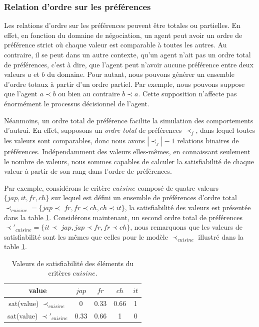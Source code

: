 \subsubsection{Relation d'ordre sur les préférences}

Les relations d'ordre sur les préférences peuvent être totales ou partielles. En effet, en fonction du domaine de négociation, un agent peut avoir un ordre de préférence strict où chaque valeur est comparable à toutes les autres. Au contraire, il se peut dans un autre contexte, qu'un agent n'ait pas un ordre total de préférences, c'est à dire, que l'agent peut n'avoir aucune préférence entre deux valeurs $a$ et $b$ du domaine. Pour autant, nous pouvons générer un ensemble d'ordre totaux à partir d'un ordre partiel. Par exemple, nous pouvons suppose que l'agent $a \prec b$ ou bien au contraire $b \prec a$. Cette supposition n'affecte pas énormément le processus décisionnel de l'agent. 

Néanmoins, un ordre total de préférence facilite la simulation des comportements d'autrui. En effet, supposons un \textit{ordre total} de préférences $\prec_j$, dans lequel toutes les valeurs sont comparables, donc nous avons $|\prec_j| -1$ relations binaires de préférences. Indépendamment des valeurs elles-mêmes, en connaissant seulement le nombre de valeurs, nous sommes capables de calculer la satisfiabilité de chaque valeur à partir de son rang dans l'ordre de préférences.

Par exemple, considérons le critère $cuisine$ composé de quatre valeurs $\{jap,it,fr,ch\}$ sur lequel est défini un ensemble de préférences d'ordre total $\prec_{cuisine} = \{jap$$\prec$ $fr, fr$$\prec$$ ch, ch$$\prec$$it\}$, la satisfiabilité des valeurs est présentée dans la table \ref{tab:ex2_sat}. Considérons maintenant, un second ordre total de préférences $\prec'_{cuisine} = \{it$$\prec$ $jap, jap$$\prec$$ fr, fr$$\prec$$ch\}$, nous remarquons que les valeurs de satisfiabilité sont les mêmes que celles pour le modèle $\prec_{cuisine}$ illustré dans la table \ref{tab:ex2_sat}. 


	\begin{table} [h]
		\centering
		\caption{Valeurs de satisfiabilité des éléments du critères $cuisine$.}
		\begin{tabular}{ |c|c|c|c|c| }
			\hline
			value & $jap$ & $fr$ & $ch$ & $it$ \\	
			\hline
			sat(value) $\prec_{cuisine}$ & 0 & 0.33 & 0.66 & 1 \\
			\hline
			sat(value) $\prec'_{cuisine}$ & 0.33 & 0.66 & 1 & 0 \\
			\hline
		\end{tabular}
		
		\label{tab:ex2_sat}
		
	\end{table}
	

